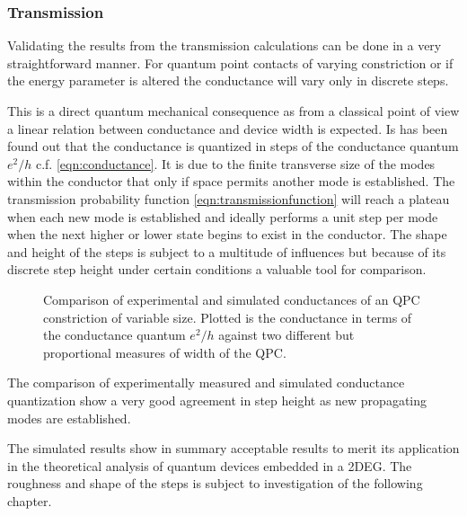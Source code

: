 \subsubsection{Transmission}
Validating the results from the transmission calculations can be done in a very straightforward manner. For quantum point contacts of varying constriction or if the energy parameter is altered the conductance will vary only in discrete steps.\par
This is a direct quantum mechanical consequence as from a classical point of view a linear relation between conductance and device width is expected.
Is has been found out that the conductance is quantized in steps of the conductance quantum $e^2/h$ c.f. \cref{eqn:conductance}.
It is due to the finite transverse size of the modes within the conductor that only if space permits another mode is established. The transmission probability function \ref{eqn:transmissionfunction} will reach a plateau when each new mode is established and ideally performs a unit step per mode when the next higher or lower state begins to exist in the conductor. The shape and height of the steps is subject to a multitude of influences but because of its discrete step height under certain conditions a valuable tool for comparison.\par
\begin{figure}[h]
  \begin{center}
    \caption{Comparison of experimental and simulated conductances of an QPC constriction of variable size. Plotted is the conductance in terms of the conductance quantum $e^2/h$ against two different but proportional measures of width of the QPC.}
\end{center}
\end{figure}
The comparison of experimentally measured and simulated conductance quantization show a very good agreement in step height as new propagating modes are established.\par
The simulated results show in summary acceptable results to merit its application in the theoretical analysis of quantum devices embedded in a 2DEG.
The roughness and shape of the steps is subject to investigation of the following chapter.\par
\FloatBarrier
